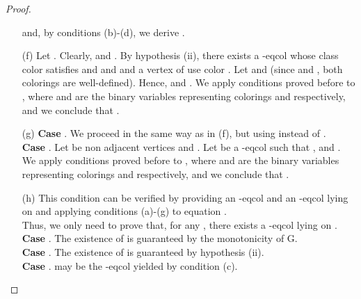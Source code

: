 \begin{proof}
\begin{enumerate}
and, by conditions (b)-(d), we derive
.
\item[(f)] Let . Clearly,  and
. By hypothesis (ii), there exists a -eqcol  whose
class color  satisfies  and  and  and a vertex of  use
color . Let  and  (since  and , both colorings are
well-defined). Hence,  and . We apply conditions proved before to
, where  and  are the binary variables representing colorings
 and  respectively, and we conclude that
.
\item[(g)] \textbf{Case }. We proceed in the same way as in (f), but using
 instead of
.\\
\textbf{Case }. Let  be non adjacent vertices and . Let  be a -eqcol such that
,  and . We apply conditions proved before
to , where  and  are the binary variables representing colorings
 and  respectively, and we conclude that .
\item[(h)] This condition can be verified by providing an -eqcol  and an -eqcol
 lying on  and applying conditions (a)-(g) to equation .\\
Thus, we only need to prove that, for any , there exists a -eqcol  lying on  .\\ 
\textbf{Case }. The existence of  is guaranteed by the monotonicity of G.\\
\textbf{Case }. The existence of  is guaranteed by hypothesis (ii).\\
\textbf{Case }.  may be the -eqcol yielded by condition (c).
\end{enumerate}
\end{proof}

